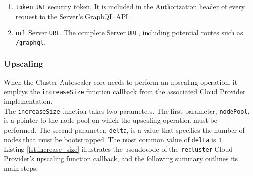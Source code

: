 \begin{enumerate}
  \item \texttt{token}
    \newline
    \texttt{JWT} security token.
    \newline
    It is included in the Authorization header of every request to the Server's
    GraphQL API.

  \item \texttt{url}
    \newline
    Server \texttt{URL}.
    \newline
    The complete Server \texttt{URL}, including potential routes such as \texttt{/graphql}.
\end{enumerate}

\subsubsection{Upscaling}
\label{subsubsec:implementation_autoscaling_cluster_autoscaler_upscaling}

When the Cluster Autoscaler core needs to perform an upscaling operation, it employs
the \texttt{increaseSize} function callback from the associated Cloud Provider
implementation. \\ %

The \texttt{increaseSize} function takes two parameters. The first parameter,
\texttt{nodePool}, is a pointer to the node pool on which the upscaling
operation must be performed. The second parameter, \texttt{delta}, is a value
that specifies the number of nodes that must be bootstrapped. The most common value
of \texttt{delta} is \texttt{1}. \\ %
Listing \ref{lst:increase_size} illustrates the pseudocode of the \texttt{recluster}
Cloud Provider's upscaling function callback, and the following summary outlines
its main steps:

